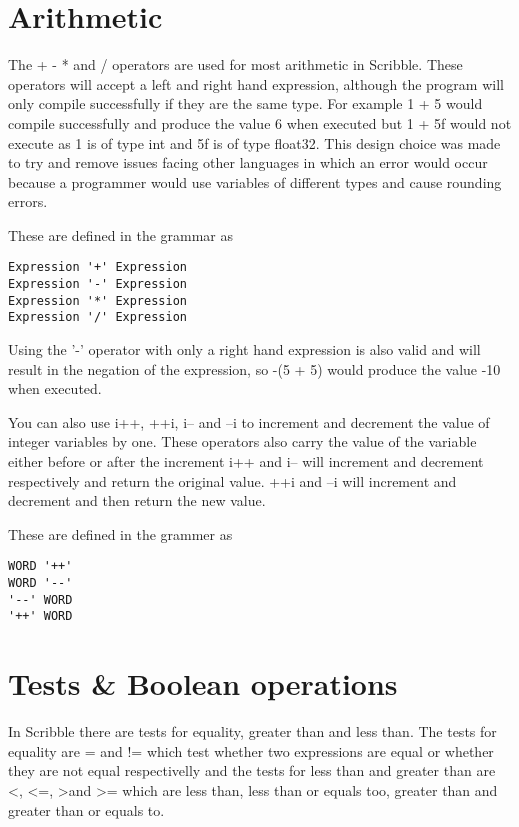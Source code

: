 \documentclass[]{final_report}
\begin{document}
\section{Arithmetic}

The + - * and / operators are used for most arithmetic in Scribble. These operators will accept a left and right hand expression, although the program will only compile successfully if they are the same type. For example 1 + 5 would compile successfully and produce the value 6 when executed but 1 + 5f would not execute as 1 is of type int and 5f is of type float32. This design choice was made to try and remove issues facing other languages in which an error would occur because a programmer would use variables of different types and cause rounding errors.

These are defined in the grammar as 
\begin{verbatim}
Expression '+' Expression
Expression '-' Expression
Expression '*' Expression
Expression '/' Expression
\end{verbatim}

Using the '-' operator with only a right hand expression is also valid and will result in the negation of the expression, so -(5 + 5) would produce the value -10 when executed.

You can also use i++, ++i, i-- and --i to increment and decrement the value of integer variables by one. These operators also carry the value of the variable either before or after the increment i++ and i-- will increment and decrement respectively and return the original value. ++i and --i will increment and decrement and then return the new value.

These are defined in the grammer as
\begin{verbatim}
WORD '++'
WORD '--'
'--' WORD
'++' WORD
\end{verbatim}


\section{Tests \& Boolean operations}

In Scribble there are tests for equality, greater than and less than. The tests for equality are = and != which test whether two expressions are equal or whether they are not equal respectivelly and the tests for less than and greater than are \textless, \textless=, \textgreater and \vspace{1pt} \textgreater= which are less than, less than or equals too, greater than and greater than or equals to.
\end{document}

